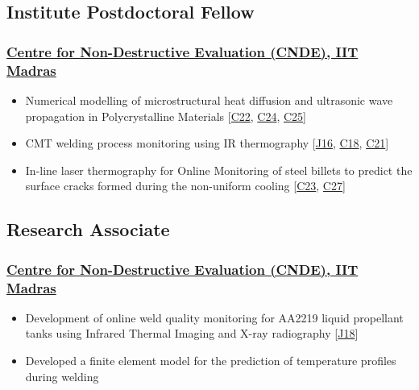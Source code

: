 \documentclass{my_cv}%
\begin{document}
\subsection{Institute Postdoctoral Fellow}
\subsubsection{\href{https://www.cnde.in/}{Centre for Non-Destructive Evaluation (CNDE), IIT Madras}}
\begin{itemize}[leftmargin=0.15in]
\setlength\itemsep{-0.1em}
\color{mygray}
\item Numerical modelling of microstructural heat diffusion and ultrasonic wave propagation in Polycrystalline Materials [\textcolor{mypink}{\hyperref[C22]{C22}}, \textcolor{mypink}{\hyperref[C24]{C24}}, \textcolor{mypink}{\hyperref[C25]{C25}}]
\item CMT welding process monitoring using IR thermography [\textcolor{mypink}{\hyperref[J16]{J16}}, \textcolor{mypink}{\hyperref[C18]{C18}}, \textcolor{mypink}{\hyperref[C21]{C21}}]
\item In-line laser thermography for Online Monitoring of steel billets to predict the surface cracks formed during the non-uniform cooling [\textcolor{mypink}{\hyperref[C23]{C23}}, \textcolor{mypink}{\hyperref[C27]{C27}}]
\end{itemize}
{\color{mygray1} \hdashrule[0.1ex]{18.8cm}{0.2mm}{1mm}}
\subsection{Research Associate}
\subsubsection{\href{https://www.cnde.in/}{Centre for Non-Destructive Evaluation (CNDE), IIT Madras}}
\begin{itemize}[leftmargin=0.15in]
\setlength\itemsep{-0.1em}
\color{mygray}
\item Development of online weld quality monitoring for AA2219 liquid propellant tanks using Infrared Thermal Imaging and X-ray radiography [\textcolor{mypink}{\hyperref[J18]{J18}}]
\item Developed a finite element model for the prediction of temperature profiles during welding
\end{itemize}
\end{document}
